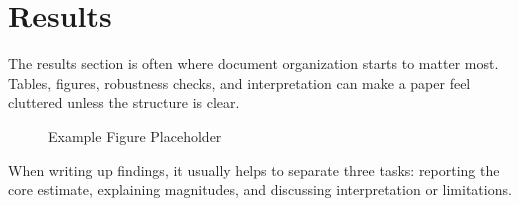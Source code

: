 \section{Results}

The results section is often where document organization starts to matter most. Tables, figures, robustness checks, and interpretation can make a paper feel cluttered unless the structure is clear.

\begin{figure}[H]
  \caption{Example Figure Placeholder}
\end{figure}

When writing up findings, it usually helps to separate three tasks: reporting the core estimate, explaining magnitudes, and discussing interpretation or limitations.

